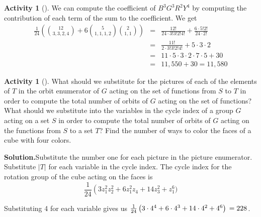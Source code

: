 \documentclass[10pt,]{book}
\theoremstyle{plain}
\theoremstyle{definition}
\newtheorem{activity}[project]{Activity}
\numberwithin{equation}{chapter}
\newcommand{\amp}{&}
\begin{document}
\begin{activity}[]
\par
We can compute the coefficient of \(B^3G^3R^2Y^4\) by computing the contribution of each term of the sum to the coefficient. We get%
\begin{align*}
\frac{1}{24}\left(\binom{12}{3,3,2,4}+ 6\binom{5}{1,1,1,2}\binom{2}{1,1}\right)\amp =\amp \frac{12!}{24\cdot3!3!2!4!}+\frac{6\cdot5!2!}{24\cdot2!}\\
\amp =\amp \frac{11!}{2\cdot3!3!2!4!}+5
\cdot3\cdot2\\
\amp =\amp 11\cdot5\cdot3\cdot2\cdot7\cdot5+30\\
\amp =\amp 11,550+30=11,580
\end{align*}
%
\end{activity}
\begin{activity}[]\label{activity-315}
What should we substitute for the pictures of each of the elements of \(T\) in the orbit enumerator of \(G\) acting on the set of functions from \(S\) to \(T\) in order to compute the total number of orbits of \(G\) acting on the set of functions? What should we substitute into the variables in the cycle index of a group \(G\) acting on a set \(S\) in order to compute the total number of orbits of \(G\) acting on the functions from \(S\) to a set \(T\)? Find the number of ways to color the faces of a cube with four colors.%
\par\medskip\noindent%
\textbf{Solution.}\quad Substitute the number one for each picture in the picture enumerator. Substitute \(|T|\) for each variable in the cycle index. The cycle index for the rotation group of the cube acting on the faces is%
\begin{equation*}
\frac{1}{24}\left(3z_1^2z_2^2+ 6z_1^2z_4 +14z_3^2+z_1^6\right.)
\end{equation*}
%
\par
Substituting 4 for each variable gives us \(\frac{1}{24}\left(3\cdot4^4+6\cdot4^3+14\cdot 4^2+4^6\right)\\=228\).%
\end{activity}
\end{document}
